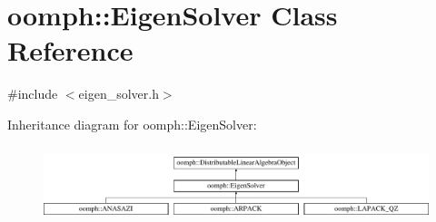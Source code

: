 \hypertarget{classoomph_1_1EigenSolver}{}\section{oomph\+:\+:Eigen\+Solver Class Reference}
\label{classoomph_1_1EigenSolver}


{\ttfamily \#include $<$eigen\+\_\+solver.\+h$>$}

Inheritance diagram for oomph\+:\+:Eigen\+Solver\+:\begin{figure}[H]
\begin{center}
\leavevmode
\includegraphics[height=2.231076cm]{classoomph_1_1EigenSolver}
\end{center}
\end{figure}
